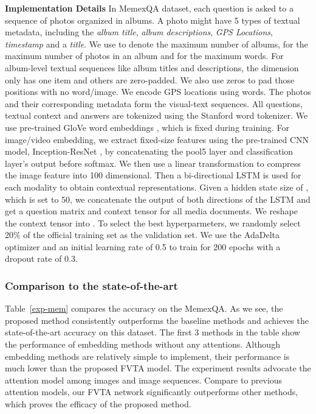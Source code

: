 \noindent\textbf{Implementation Details}
\label{sec-impl}
In MemexQA dataset, each question is asked to a sequence of photos organized in albums. A photo might have 5 types of textual metadata, including the \textit{album title}, \textit{album descriptions},  \textit{GPS Locations}, \textit{timestamp} and a \textit{title}. We use   to denote the maximum number of albums,  for the maximum number of photos in an album and  for the maximum words. For album-level textual sequences like album titles and descriptions, the  dimension only has one item and others are zero-padded. We also use zeros to pad those positions with no word/image.
We encode GPS locations using words.
The photos and their corresponding metadata form the visual-text sequences. All questions, textual context and answers are tokenized using the Stanford word tokenizer. We use pre-trained GloVe word embeddings \cite{pennington2014glove}, which is fixed during training.
For image/video embedding, we extract fixed-size features using the pre-trained CNN model, Inception-ResNet \cite{szegedy2017inception}, by concatenating the pool5 layer and classification layer's output before softmax. We then use a linear transformation to compress the image feature into 100 dimensional.
Then a bi-directional LSTM is used for each modality to obtain contextual representations. Given a hidden state size of ,  which is set to 50, we concatenate the output of both directions of the LSTM and get a question matrix 
and context tensor  for all media documents. 
We reshape the context tensor into . 
To select the best hyperparmeters, we randomly select 20\% of the official training set as the validation set.
We use the AdaDelta \cite{zeiler2012adadelta} optimizer and an initial learning rate of 0.5 to train for 200 epochs with a dropout rate of 0.3.





\subsubsection{Comparison to the state-of-the-art} \label{FVT_comp_exp}

Table~\ref{exp-mem} compares the accuracy on the MemexQA. As we see, the proposed method consistently outperforms the baseline methods and achieves the state-of-the-art accuracy on this dataset. The first 3 methods in the table show the performance of embedding methods without any attentions. Although embedding methods are relatively simple to implement, their performance is much lower than the proposed FVTA model. The experiment results advocate the attention model among images and image sequences. Compare to previous attention models, our FVTA network significantly outperforms other methods, which proves the efficacy of the proposed method.










